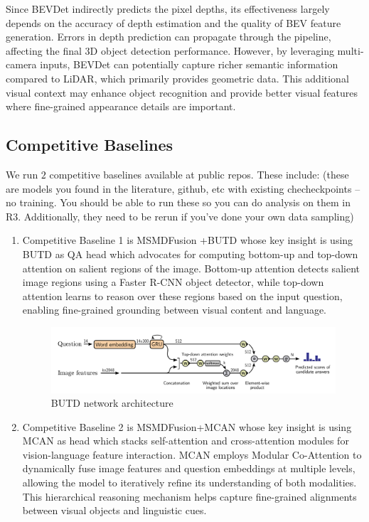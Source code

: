 \documentclass{article} %
\begin{document}
	Since BEVDet indirectly predicts the pixel depths, its effectiveness largely depends on the accuracy of depth estimation and the quality of BEV feature generation. Errors in depth prediction can propagate through the pipeline, affecting the final 3D object detection performance. However, by leveraging multi-camera inputs, BEVDet can potentially capture richer semantic information compared to LiDAR, which primarily provides geometric data. This additional visual context may enhance object recognition and provide better visual features where fine-grained appearance details are important.
	
	
	
	\subsection{ Competitive Baselines}
	We run $2$ competitive baselines available at public repos.  These include: 
	(these are models you found in the literature, github, etc with existing checheckpoints -- no training. You should be able to run these so you can do analysis on them in R3.  Additionally, they need to be rerun if you've done your own data sampling)
	
	\begin{enumerate}
		\item Competitive Baseline 1 is MSMDFusion \cite{Jiao2022MSMDFusionFL}+BUTD \cite{Anderson2017BottomUpAT} whose key insight is using BUTD as QA head which advocates for computing bottom-up and top-down attention on salient regions of the image. Bottom-up attention detects salient image regions using a Faster R-CNN object detector, while top-down attention learns to reason over these regions based on the input question, enabling fine-grained grounding between visual content and language.
		
		\begin{figure}[H]
			\centering
			\includegraphics[width=0.75\linewidth]{Figures/BUTD Framework.png}
			\caption{BUTD network architecture}
			\label{fig:butd}
		\end{figure}
		
		
		\item Competitive Baseline 2 is MSMDFusion+MCAN \cite{Yu2019DeepMC} whose key insight is using MCAN as head which stacks self-attention and cross-attention modules for vision-language feature interaction. MCAN employs Modular Co-Attention to dynamically fuse image features and question embeddings at multiple levels, allowing the model to iteratively refine its understanding of both modalities. This hierarchical reasoning mechanism helps capture fine-grained alignments between visual objects and linguistic cues. 
	\end{enumerate}
	
\end{document}
